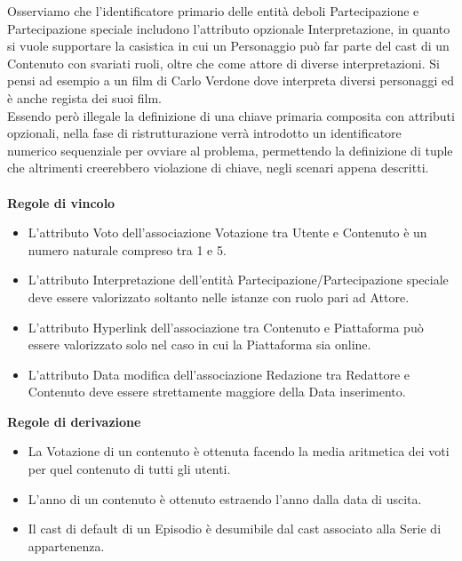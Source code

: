 \documentclass[a4paper]{article}
\begin{document}
\clearpage
Osserviamo che l'identificatore primario delle entità deboli Partecipazione e Partecipazione speciale includono 
l'attributo opzionale Interpretazione, in quanto si vuole supportare la casistica in cui un Personaggio può
far parte del cast di un Contenuto con svariati ruoli, oltre che come attore di diverse interpretazioni.
Si pensi ad esempio a un film di Carlo Verdone dove interpreta diversi personaggi ed è anche regista dei suoi film.\\
Essendo però illegale la definizione di una chiave primaria composita con attributi opzionali, nella fase di ristrutturazione
verrà introdotto un identificatore numerico sequenziale per ovviare al problema, permettendo la definizione di tuple
che altrimenti creerebbero violazione di chiave, negli scenari appena descritti.\\\\
{\large \textbf{Regole di vincolo}}
\begin{itemize}
  \item L'attributo Voto dell'associazione Votazione tra Utente e Contenuto è un numero naturale compreso tra 1 e 5.
  \item L'attributo Interpretazione dell'entità Partecipazione/Partecipazione speciale deve essere valorizzato soltanto 
  nelle istanze con ruolo pari ad Attore.
  \item L'attributo Hyperlink dell'associazione tra Contenuto e Piattaforma può essere valorizzato solo nel caso in cui la Piattaforma sia online.
  \item L'attributo Data modifica dell'associazione Redazione tra Redattore e Contenuto deve essere strettamente maggiore della Data inserimento.
\end{itemize}

\hfill \break
{\large \textbf{Regole di derivazione}}
\begin{itemize}
  \item La Votazione di un contenuto è ottenuta facendo la media aritmetica dei voti per quel contenuto di tutti gli utenti. 
  \item L'anno di un contenuto è ottenuto estraendo l'anno dalla data di uscita.
  \item Il cast di default di un Episodio è desumibile dal cast associato alla Serie di appartenenza.
\end{itemize}


\clearpage
\end{document}
